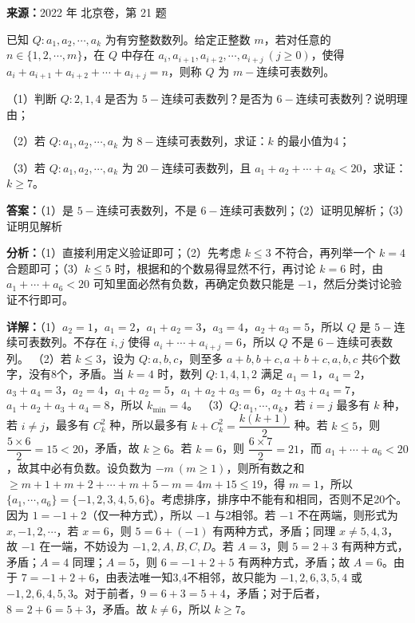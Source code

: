 \begin{question}[points=15]
\textbf{来源：}2022 年 北京卷，第 21 题\par
已知 $Q: a_1, a_2, \cdots, a_k$ 为有穷整数数列。给定正整数 $m$，若对任意的 $n\in\{1,2,\cdots,m\}$，在 $Q$ 中存在 $a_i, a_{i+1}, a_{i+2}, \cdots, a_{i+j}\ (j\geq 0)$，使得 $a_i+a_{i+1}+a_{i+2}+\cdots+a_{i+j}=n$，则称 $Q$ 为 $m-$连续可表数列。

（1）判断 $Q:2,1,4$ 是否为 $5-$连续可表数列？是否为 $6-$连续可表数列？说明理由；

（2）若 $Q: a_1, a_2, \cdots, a_k$ 为 $8-$连续可表数列，求证：$k$ 的最小值为4；

（3）若 $Q: a_1, a_2, \cdots, a_k$ 为 $20-$连续可表数列，且 $a_1+a_2+\cdots+a_k<20$，求证：$k\geq 7$。
\begin{solution}
\textbf{答案：}（1）是 $5-$连续可表数列，不是 $6-$连续可表数列；（2）证明见解析；（3）证明见解析

\textbf{分析：}（1）直接利用定义验证即可；（2）先考虑 $k\leq 3$ 不符合，再列举一个 $k=4$ 合题即可；（3）$k\leq 5$ 时，根据和的个数易得显然不行，再讨论 $k=6$ 时，由 $a_1+\cdots+a_6<20$ 可知里面必然有负数，再确定负数只能是 $-1$，然后分类讨论验证不行即可。

\textbf{详解：}（1）$a_2=1$，$a_1=2$，$a_1+a_2=3$，$a_3=4$，$a_2+a_3=5$，所以 $Q$ 是 $5-$连续可表数列。不存在 $i,j$ 使得 $a_i+\cdots+a_{i+j}=6$，所以 $Q$ 不是 $6-$连续可表数列。
（2）若 $k\leq 3$，设为 $Q:a,b,c$，则至多 $a+b,b+c,a+b+c,a,b,c$ 共6个数字，没有8个，矛盾。当 $k=4$ 时，数列 $Q:1,4,1,2$ 满足 $a_1=1$，$a_4=2$，$a_3+a_4=3$，$a_2=4$，$a_1+a_2=5$，$a_1+a_2+a_3=6$，$a_2+a_3+a_4=7$，$a_1+a_2+a_3+a_4=8$，所以 $k_{\min}=4$。
（3）$Q: a_1,\cdots,a_k$，若 $i=j$ 最多有 $k$ 种，若 $i\neq j$，最多有 $C_k^2$ 种，所以最多有 $k+C_k^2 = \dfrac{k(k+1)}{2}$ 种。若 $k\leq 5$，则 $\dfrac{5\times6}{2}=15<20$，矛盾，故 $k\geq 6$。若 $k=6$，则 $\dfrac{6\times7}{2}=21$，而 $a_1+\cdots+a_6<20$，故其中必有负数。设负数为 $-m\ (m\geq 1)$，则所有数之和 $\geq m+1 + m+2 + \cdots + m+5 - m = 4m+15 \leq 19$，得 $m=1$，所以 $\{a_1,\cdots,a_6\}=\{-1,2,3,4,5,6\}$。考虑排序，排序中不能有和相同，否则不足20个。因为 $1=-1+2$（仅一种方式），所以 $-1$ 与2相邻。若 $-1$ 不在两端，则形式为 $x,-1,2,\cdots$，若 $x=6$，则 $5=6+(-1)$ 有两种方式，矛盾；同理 $x\neq 5,4,3$，故 $-1$ 在一端，不妨设为 $-1,2,A,B,C,D$。若 $A=3$，则 $5=2+3$ 有两种方式，矛盾；$A=4$ 同理；$A=5$，则 $6=-1+2+5$ 有两种方式，矛盾；故 $A=6$。由于 $7=-1+2+6$，由表法唯一知3,4不相邻，故只能为 $-1,2,6,3,5,4$ 或 $-1,2,6,4,5,3$。对于前者，$9=6+3=5+4$，矛盾；对于后者，$8=2+6=5+3$，矛盾。故 $k\neq 6$，所以 $k\geq 7$。
\end{solution}
\end{question}


